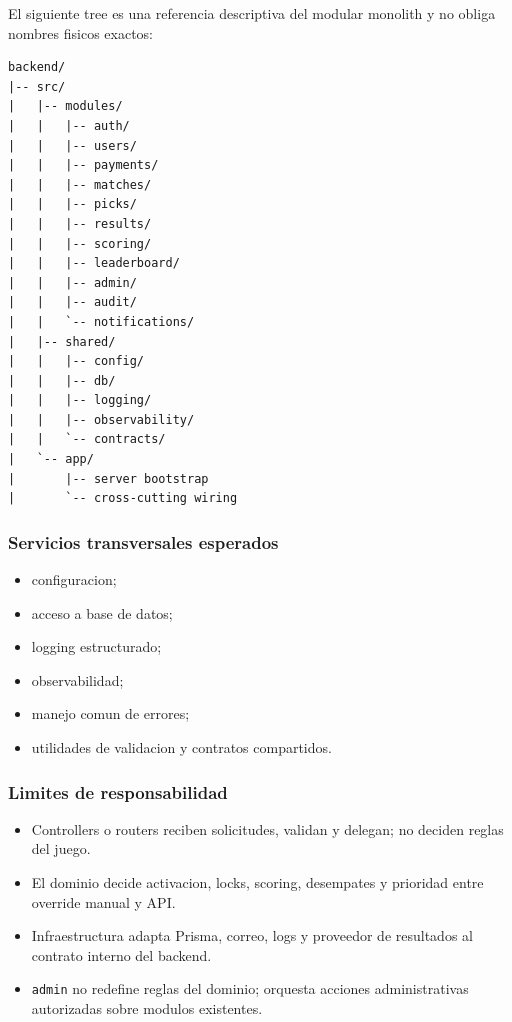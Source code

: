 El siguiente tree es una referencia descriptiva del modular monolith y no obliga nombres fisicos exactos:

\begin{verbatim}
backend/
|-- src/
|   |-- modules/
|   |   |-- auth/
|   |   |-- users/
|   |   |-- payments/
|   |   |-- matches/
|   |   |-- picks/
|   |   |-- results/
|   |   |-- scoring/
|   |   |-- leaderboard/
|   |   |-- admin/
|   |   |-- audit/
|   |   `-- notifications/
|   |-- shared/
|   |   |-- config/
|   |   |-- db/
|   |   |-- logging/
|   |   |-- observability/
|   |   `-- contracts/
|   `-- app/
|       |-- server bootstrap
|       `-- cross-cutting wiring
\end{verbatim}

\subsubsection{Servicios transversales esperados}

\begin{itemize}
  \item configuracion;
  \item acceso a base de datos;
  \item logging estructurado;
  \item observabilidad;
  \item manejo comun de errores;
  \item utilidades de validacion y contratos compartidos.
\end{itemize}

\subsubsection{Limites de responsabilidad}

\begin{itemize}
  \item Controllers o routers reciben solicitudes, validan y delegan; no deciden reglas del juego.
  \item El dominio decide activacion, locks, scoring, desempates y prioridad entre override manual y API.
  \item Infraestructura adapta Prisma, correo, logs y proveedor de resultados al contrato interno del backend.
  \item \texttt{admin} no redefine reglas del dominio; orquesta acciones administrativas autorizadas sobre modulos existentes.
\end{itemize}

